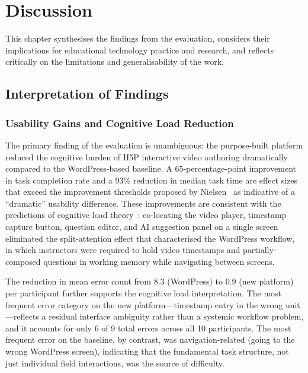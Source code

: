 \chapter{Discussion}

This chapter synthesises the findings from the evaluation, considers their
implications for educational technology practice and research, and reflects
critically on the limitations and generalisability of the work.

\section{Interpretation of Findings}

\subsection{Usability Gains and Cognitive Load Reduction}

The primary finding of the evaluation is unambiguous: the purpose-built
platform reduced the cognitive burden of H5P interactive video authoring
dramatically compared to the WordPress-based baseline. A 65-percentage-point
improvement in task completion rate and a 93\% reduction in median task time
are effect sizes that exceed the improvement thresholds proposed by
Nielsen~\cite{nielsen1994} as indicative of a ``dramatic'' usability
difference. These improvements are consistent with the predictions of
cognitive load theory~\cite{sweller1988,chandler1991}: co-locating the
video player, timestamp capture button, question editor, and AI suggestion
panel on a single screen eliminated the split-attention effect that
characterised the WordPress workflow, in which instructors were required to
hold video timestamps and partially-composed questions in working memory
while navigating between screens.

The reduction in mean error count from 8.3 (WordPress) to 0.9 (new
platform) per participant further supports the cognitive load interpretation.
The most frequent error category on the new platform---timestamp entry in
the wrong unit---reflects a residual interface ambiguity rather than a
systemic workflow problem, and it accounts for only 6 of 9 total errors
across all 10 participants. The most frequent error on the baseline, by
contrast, was navigation-related (going to the wrong WordPress screen),
indicating that the fundamental task structure, not just individual field
interactions, was the source of difficulty.

